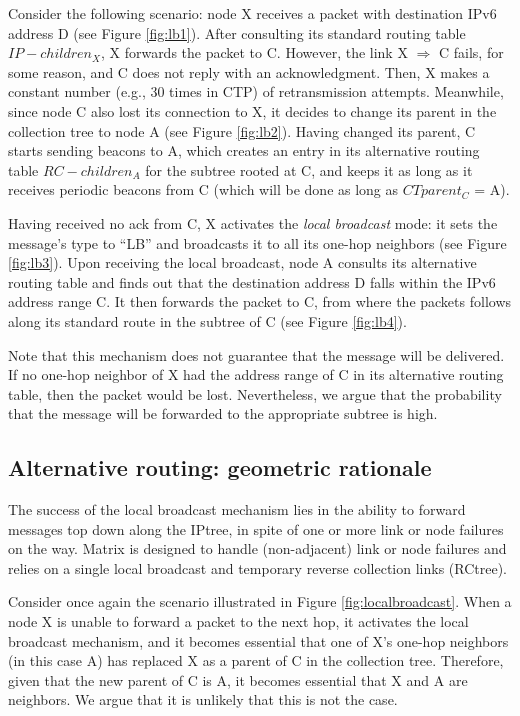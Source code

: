 Consider the following scenario: node X receives a packet with destination IPv6
address D (see Figure \ref{fig:lb1}). After consulting its standard routing
table $IP-children_X$, X forwards the packet to C. However, the link X
$\Rightarrow$ C fails, for some reason, and C does not reply with an
acknowledgment.
Then, X makes a constant number (e.g., 30 times in CTP) of retransmission
attempts. Meanwhile, since node C also lost its connection to X, it decides to
change its parent in the collection tree to node A (see Figure \ref{fig:lb2}).
Having changed its parent, C starts sending beacons to A, which creates an entry
in its alternative routing table $RC-children_A$ for the subtree rooted at C, and
keeps it as long as it receives periodic beacons from C (which will be done as long as $CTparent_C$ = A).

Having received no ack from C, X activates the \textit{local
broadcast} mode: it sets the message's type to ``LB'' and broadcasts
it to all its one-hop neighbors (see Figure \ref{fig:lb3}). Upon
receiving the local broadcast, node A consults its alternative
routing table and finds out that the destination address D falls
within the IPv6 address range C. It then forwards the packet to C,
from where the packets follows along its standard route in the
subtree of C (see Figure \ref{fig:lb4}).

Note that this
mechanism does not guarantee that the message will be delivered. If no one-hop
neighbor of X had the address range of C in its alternative routing table, then
the packet would be lost. Nevertheless, we argue that the probability that the
message will be forwarded to the appropriate subtree is high.

\subsection{Alternative routing: geometric rationale}
The success of the local broadcast mechanism lies in the ability to forward
messages top down along the IPtree, in spite of one or more link or node
failures on the way.
Matrix is designed to handle (non-adjacent) link or node failures and relies on
a single local broadcast and temporary reverse collection links (RCtree).

Consider once again the scenario illustrated in Figure \ref{fig:localbroadcast}.
When a node X is unable to forward a packet to the next hop, it activates the
local broadcast mechanism, and it becomes essential that one of X's one-hop
neighbors (in this case A) has replaced X as a parent of C in
the collection tree. Therefore, given that the new parent of C is A, it becomes
essential that X and A are neighbors. We argue that it is unlikely that this is not the case.

